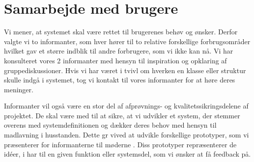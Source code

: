 
\section{Samarbejde med brugere}
\label{sec:samarbejde}

Vi mener, at systemet skal være rettet til brugerenes behøv og ønsker. Derfor valgte vi to informanter, som hver hører til to relative forskellige forbrugsområder hvilket gav et større indblik til andre forbrugere, som vi ikke kan nå. Vi har konsulteret vores 2 informanter med hensyn til inspiration og opklaring af gruppediskussioner. Hvis vi har været i tvivl om hverken en klasse eller struktur skulle indgå i systemet, tog vi kontakt til vores informanter for at høre deres meninger.

Informanter vil også være en stor del af afprøvnings- og kvalitetssikringsdelene af projektet. De skal være med til at sikre, at vi udvikler et system, der stemmer overens med systemdefinitionen og dækker deres behov med hensyn til madlavning i husstanden. Dette gr vived at udvikle forskellige prototyper, som vi præsenterer for informanterne til møderne . Diss prototyper repræsenterer de id\'{e}er, i har til en given funktion eller systemsdel, som vi ønsker at få feedback på.
